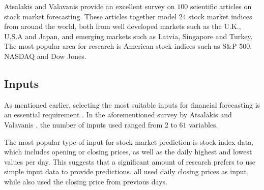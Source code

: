 \documentclass{UoYCSproject}
\begin{document}
Atsalakis and Valavanis \cite{atsalakis2009surveying} provide an excellent survey on $100$ scientific articles on stock market forecasting. These articles together model $24$ stock market indices from around the world, both from well developed markets such as the U.K., U.S.A and Japan, and emerging markets such as Latvia, Singapore and Turkey. The most popular area for research is American stock indices such as S\&P 500, NASDAQ and Dow Jones.

\subsection{Inputs}
As mentioned earlier, selecting the most suitable inputs for financial forecasting is an essential requirement \cite{zhong2017forecasting}. In the aforementioned survey by Atsalakis and Valavanis \cite{atsalakis2009surveying}, the number of inputs used ranged from $2$ to $61$ variables. 

The most popular type of input for stock market prediction is stock index data, which includes opening or closing prices, as well as the daily highest and lowest values per day. This suggests that a significant amount of research prefers to use simple input data to provide predictions. \cite{barnes2000study, donaldson1999neural, halliday2004equity, tan1995conservative, pai2005hybrid, pantazopoulos1998financial} all used daily closing prices as input, while \cite{andreou2000testing, fernandez2000profitability, pan2005predicting,tang2002web} also used the closing price from previous days. 
\end{document}

